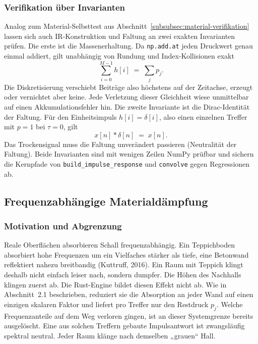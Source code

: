 \subsubsection{Verifikation über Invarianten}
\label{subsubsec:faltung-verifikation}

Analog zum Material-Selbsttest aus
Abschnitt~\ref{subsubsec:material-verifikation} lassen sich auch
IR-Konstruktion und Faltung an zwei exakten Invarianten prüfen. Die erste ist
die Massenerhaltung. Da \texttt{np.add.at} jeden Druckwert genau einmal addiert,
gilt unabhängig von Rundung und Index-Kollisionen exakt
\[
    \sum_{i=0}^{M-1} h[i] \;=\; \sum_{j} p_j .
\]
Die Diskretisierung verschiebt Beiträge also höchstens auf der Zeitachse, erzeugt
oder vernichtet aber keine. Jede Verletzung dieser Gleichheit wiese unmittelbar
auf einen Akkumulationsfehler hin. Die zweite Invariante ist die
Dirac-Identität der Faltung. Für den Einheitsimpuls $h[i] = \delta[i]$, also
einen einzelnen Treffer mit $p = 1$ bei $\tau = 0$, gilt
\[
    x[n] * \delta[n] \;=\; x[n].
\]
Das Trockensignal muss die Faltung unverändert passieren (Neutralität der
Faltung). Beide Invarianten sind mit wenigen Zeilen NumPy prüfbar und sichern
die Kernpfade von \texttt{build\_impulse\_response} und \texttt{convolve} gegen
Regressionen ab.

\subsection{Frequenzabhängige Materialdämpfung}
\label{subsec:material}

\subsubsection{Motivation und Abgrenzung}
\label{subsubsec:material-motivation}

Reale Oberflächen absorbieren Schall frequenzabhängig. Ein Teppichboden
absorbiert hohe Frequenzen um ein Vielfaches stärker als tiefe, eine Betonwand
reflektiert nahezu breitbandig (Kuttruff, 2016). Ein Raum mit Teppich klingt
deshalb nicht einfach leiser nach, sondern dumpfer. Die Höhen des Nachhalls
klingen zuerst ab. Die Rust-Engine bildet diesen Effekt nicht ab. Wie in
Abschnitt~2.1 beschrieben, reduziert sie die Absorption an jeder Wand auf einen
einzigen skalaren Faktor und liefert pro Treffer nur den Restdruck $p_j$. Welche
Frequenzanteile auf dem Weg verloren gingen, ist an dieser Systemgrenze bereits
ausgelöscht. Eine aus solchen Treffern gebaute Impulsantwort ist zwangsläufig
spektral neutral. Jeder Raum klänge nach demselben „grauen“ Hall.

